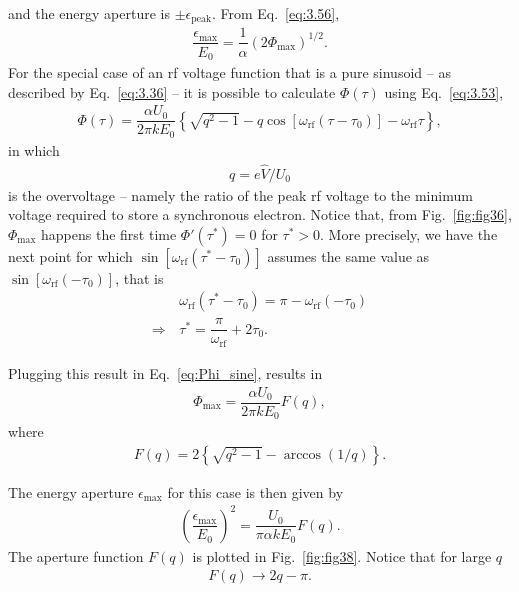  and the energy aperture is $\pm\epsilon_\text{peak}$. From Eq.~\eqref{eq:3.56},
\begin{align}
	\dfrac{\epsilon_{\max}}{E_0} = \dfrac{1}{\alpha} (2 \Phi_{\max})^{1/2}.
\end{align}
For the special case of an rf voltage function that is a pure sinusoid -- as described by Eq.~\eqref{eq:3.36} -- it is possible to calculate $\Phi(\tau)$ using Eq.~\eqref{eq:3.53},
\begin{align}\label{eq:Phi_sine}
	\Phi(\tau) = \dfrac{\alpha U_0}{2\pi k E_0} \left\lbrace \sqrt{q^2-1} - q \cos [\omega_{\text{rf}}(\tau - \tau_0)] - \omega_{\text{rf}} \tau \right\rbrace,
\end{align}
in which 
\begin{align} \label{eq:3.60}
q = e\hat{V}/U_0
\end{align}
is the overvoltage -- namely the ratio of the peak rf voltage to the minimum voltage required to store a synchronous electron. Notice that, from Fig.~\ref{fig:fig36}, $\Phi_{\max}$ happens the first time $\Phi'(\tau^*) = 0$ for $\tau^* > 0$. More precisely, we have the next point for which $\sin[\omega_{\text{rf}}(\tau^*-\tau_0)]$ assumes the same value as $\sin[\omega_{\text{rf}}(-\tau_0)]$, that is
\begin{align*}
	& \omega_{\text{rf}}(\tau^* - \tau_0) = \pi - \omega_{\text{rf}}(-\tau_0) \\
    \Rightarrow \, & \tau^* = \dfrac{\pi}{\omega_{\text{rf}}} + 2\tau_0.
\end{align*}

Plugging this result in Eq.~\eqref{eq:Phi_sine}, results in
\begin{align} \label{eq:3.58}
	\Phi_{\max} = \dfrac{\alpha U_0}{2\pi k E_0} F(q),
\end{align}
where
\begin{align}
	F(q) = 2\left\lbrace \sqrt{q^2 - 1} - \arccos(1/q) \right\rbrace.
\end{align}

The energy aperture $\epsilon_{\max}$ for this case is then given by
\begin{align}
	\left(\dfrac{\epsilon_{\max}}{E_0}\right)^2 = \dfrac{U_0}{\pi \alpha k E_0} F(q).
\end{align}
The aperture function $F(q)$ is plotted in Fig.~\ref{fig:fig38}. Notice that for large $q$
\begin{align}
	F(q) \to 2q - \pi.
\end{align}

